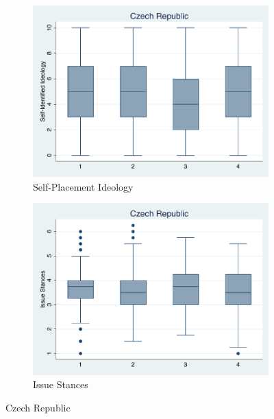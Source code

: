 \documentclass[12pt, titlepage]{article}
\begin{document}
\begin{figure}[H]
	\centering
	\begin{subfigure}[b]{0.475\textwidth}   
		\centering 
		\includegraphics[width=\textwidth]{IdeoBP/Czech}
		\caption{Self-Placement Ideology}
	\end{subfigure}
	\hfill
	\begin{subfigure}[b]{0.475\textwidth}
		\centering 
		\includegraphics[width=\textwidth]{BoxLib/Czech}
		\caption{Issue Stances}
	\end{subfigure}
	\caption{Czech Republic}
	\label{Czech}
\end{figure}
\end{document}
